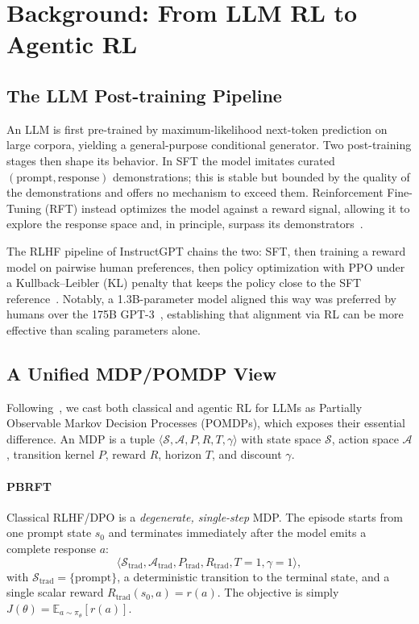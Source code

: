 \section{Background: From LLM RL to Agentic RL}\label{sec:background}

\subsection{The LLM Post-training Pipeline}

An LLM is first pre-trained by maximum-likelihood next-token
prediction on large corpora, yielding a general-purpose conditional
generator. Two post-training stages then shape its behavior. In
SFT the model imitates curated
$(\text{prompt},\text{response})$ demonstrations; this is stable but
bounded by the quality of the demonstrations and offers no mechanism to
exceed them. Reinforcement Fine-Tuning (RFT) instead optimizes
the model against a reward signal, allowing it to explore the response
space and, in principle, surpass its demonstrators~\cite{ouyang2022instructgpt}.

The RLHF pipeline of InstructGPT chains the two: SFT, then
training a reward model on pairwise human preferences, then policy
optimization with PPO under a Kullback--Leibler (KL) penalty that keeps
the policy close to the SFT reference~\cite{ziegler2019finetuning,stiennon2020summarize}. Notably, a 1.3B-parameter model aligned this way was preferred by
humans over the 175B GPT-3~\cite{ouyang2022instructgpt}, establishing
that alignment via RL can be more effective than scaling parameters
alone.

\subsection{A Unified MDP/POMDP View}

Following~\cite{zhang2026landscape}, we cast both
classical and agentic RL for LLMs as Partially Observable Markov Decision
Processes (POMDPs), which exposes their essential difference. An MDP is a
tuple $\langle \mathcal{S}, \mathcal{A}, P, R, T, \gamma \rangle$ with
state space $\mathcal{S}$, action space $\mathcal{A}$, transition kernel
$P$, reward $R$, horizon $T$, and discount $\gamma$.

\paragraph{PBRFT} Classical RLHF/DPO is a
\emph{degenerate, single-step} MDP. The episode starts from one prompt
state $s_0$ and terminates immediately after the model emits a complete
response $a$:
\begin{equation}
\langle \mathcal{S}_{\text{trad}}, \mathcal{A}_{\text{trad}},
P_{\text{trad}}, R_{\text{trad}}, T{=}1, \gamma{=}1 \rangle ,
\end{equation}
with $\mathcal{S}_{\text{trad}}=\{\text{prompt}\}$, a deterministic
transition to the terminal state, and a single scalar reward
$R_{\text{trad}}(s_0,a)=r(a)$. The objective is simply
$J(\theta)=\mathbb{E}_{a\sim\pi_\theta}[r(a)]$.

